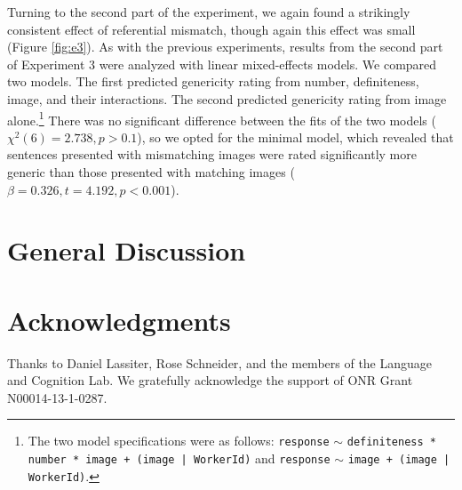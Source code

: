 \documentclass[10pt,letterpaper]{article}
\begin{document}
Turning to the second part of the experiment, we again found a strikingly consistent effect of referential mismatch, though again this effect was small (Figure \ref{fig:e3}). As with the previous experiments, results from the second part of Experiment 3 were analyzed with linear mixed-effects models. We compared two models. The first predicted genericity rating from number, definiteness, image, and their interactions. The second predicted genericity rating from image alone.\footnote{The two model specifications were as follows: \texttt{response} \(\sim\) \texttt{definiteness * number * image + (image | WorkerId)} and \texttt{response} \(\sim\) \texttt{image + (image | WorkerId)}.} There was no significant difference between the fits of the two models (\(\chi^2(6) = 2.738, p > 0.1\)), so we opted for the minimal model, which revealed that sentences presented with mismatching images were rated significantly more generic than those presented with matching images (\(\beta = 0.326, t = 4.192, p < 0.001\)).

\section{General Discussion}


\section{Acknowledgments}

Thanks to Daniel Lassiter, Rose Schneider, and the members of the Language and Cognition Lab. We gratefully acknowledge the support of ONR Grant N00014-13-1-0287.



\setlength{\bibleftmargin}{.125in}
\setlength{\bibindent}{-\bibleftmargin}


\end{document}
